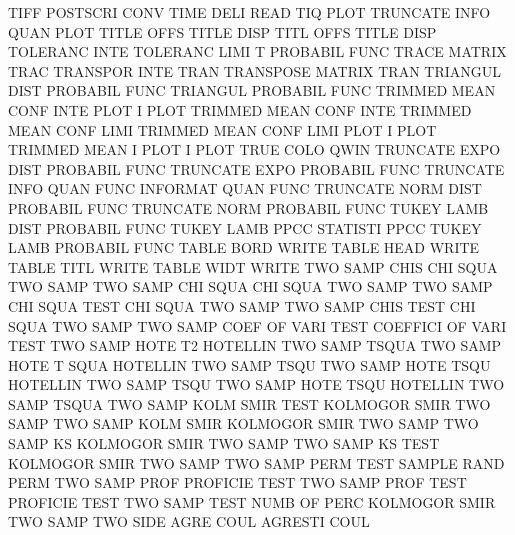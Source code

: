 TIFF                                    POSTSCRI CONV
TIME     DELI                           READ
TIQ      PLOT                           TRUNCATE INFO QUAN PLOT
TITLE    OFFS                           TITLE    DISP
TITL     OFFS                           TITLE    DISP
TOLERANC INTE                           TOLERANC LIMI
T                                       PROBABIL FUNC
TRACE                                   MATRIX   TRAC
TRANSPOR INTE                           TRAN
TRANSPOSE                               MATRIX   TRAN
TRIANGUL DIST                           PROBABIL FUNC
TRIANGUL                                PROBABIL FUNC
TRIMMED  MEAN CONF INTE PLOT            I        PLOT
TRIMMED  MEAN CONF INTE                 TRIMMED  MEAN CONF LIMI
TRIMMED  MEAN CONF LIMI PLOT            I        PLOT
TRIMMED  MEAN I    PLOT                 I        PLOT
TRUE     COLO                           QWIN
TRUNCATE EXPO DIST                      PROBABIL FUNC
TRUNCATE EXPO                           PROBABIL FUNC
TRUNCATE INFO QUAN FUNC                 INFORMAT QUAN FUNC
TRUNCATE NORM DIST                      PROBABIL FUNC
TRUNCATE NORM                           PROBABIL FUNC
TUKEY    LAMB DIST                      PROBABIL FUNC
TUKEY    LAMB PPCC                      STATISTI PPCC
TUKEY    LAMB                           PROBABIL FUNC
TABLE    BORD                           WRITE
TABLE    HEAD                           WRITE
TABLE    TITL                           WRITE
TABLE    WIDT                           WRITE
TWO      SAMP CHIS                      CHI      SQUA TWO  SAMP
TWO      SAMP CHI  SQUA                 CHI      SQUA TWO  SAMP
TWO      SAMP CHI  SQUA TEST            CHI      SQUA TWO  SAMP
TWO      SAMP CHIS TEST                 CHI      SQUA TWO  SAMP
TWO      SAMP COEF OF   VARI TEST       COEFFICI OF   VARI TEST
TWO      SAMP HOTE T2                   HOTELLIN TWO  SAMP TSQUA
TWO      SAMP HOTE T    SQUA            HOTELLIN TWO  SAMP TSQU
TWO      SAMP HOTE TSQU                 HOTELLIN TWO  SAMP TSQU
TWO      SAMP HOTE TSQU                 HOTELLIN TWO  SAMP TSQUA
TWO      SAMP KOLM SMIR TEST            KOLMOGOR SMIR TWO  SAMP
TWO      SAMP KOLM SMIR                 KOLMOGOR SMIR TWO  SAMP
TWO      SAMP KS                        KOLMOGOR SMIR TWO  SAMP
TWO      SAMP KS   TEST                 KOLMOGOR SMIR TWO  SAMP
TWO      SAMP PERM TEST                 SAMPLE   RAND PERM
TWO      SAMP PROF                      PROFICIE TEST
TWO      SAMP PROF TEST                 PROFICIE TEST
TWO      SAMP TEST NUMB OF   PERC       KOLMOGOR SMIR TWO  SAMP
TWO      SIDE AGRE COUL                 AGRESTI  COUL
